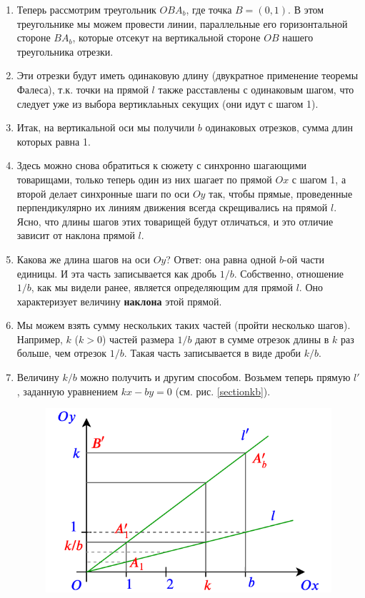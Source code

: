 \begin{enumerate}
\item Теперь рассмотрим треугольник $OBA_b$, где точка $B=(0,1)$. В этом треугольнике мы можем провести линии, параллельные его горизонтальной стороне $BA_b$, которые отсекут на вертикальной стороне $OB$ нашего треугольника отрезки.
\item Эти отрезки будут иметь одинаковую длину (двукратное применение теоремы Фалеса), т.к. точки на прямой $l$ также расставлены с одинаковым шагом, что следует уже из выбора вертиклаьных секущих (они идут с шагом 1).
\item Итак, на вертикальной оси мы получили $b$ одинаковых отрезков, сумма длин которых равна 1.
\item Здесь можно снова обратиться к сюжету с синхронно шагающими товарищами, только теперь один из них шагает по прямой $Ox$ с шагом 1, а второй делает синхронные шаги по оси $Oy$ так, чтобы прямые, проведенные перпендикулярно их линиям движения всегда скрещивались на прямой $l$. Ясно, что длины шагов этих товарищей будут отличаться, и это отличие зависит от наклона прямой $l$.
\item Какова же длина шагов на оси $Oy$? Ответ: она равна одной $b$-ой части единицы. И эта часть записывается как дробь $1/b$. Собственно, отношение $1/b$, как мы видели ранее, является определяющим для прямой $l$. Оно характеризует величину \textbf{наклона} этой прямой.
\item Мы можем взять сумму нескольких таких частей (пройти несколько шагов). Например, $k$ ($k>0$) частей размера $1/b$ дают в сумме отрезок длины в $k$ раз больше, чем отрезок $1/b$. Такая часть записывается в виде дроби $k/b$.
\item Величину $k/b$ можно получить и другим способом. Возьмем теперь прямую $l'$, заданную уравнением $kx-by=0$ (см. рис. \ref{sectionkb}).
\begin{figure}[htb!]
\begin{center}
\includegraphics[scale=0.5]{sectionkb.png}

\end{center}
\end{figure}
\end{enumerate}

